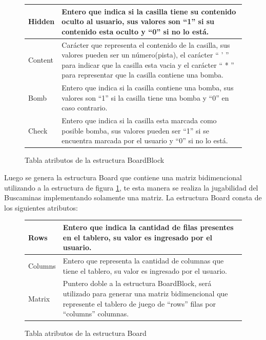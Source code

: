 \documentclass[letterpaper,12pt]{report}
\begin{document}
\begin{figure}[H]
    \centering
    \begin{tabular}{|l|p{10cm}|}
        \hline
        Hidden & Entero que indica si la casilla tiene su contenido oculto al usuario, sus valores son ``1'' si su contenido esta oculto y ``0'' si no lo está.\\
        \hline
        Content & Carácter que representa el contenido de la casilla, sus valores pueden ser un número(pista), el carácter `` ' '' para indicar que la casilla esta vacia y el carácter `` * '' para representar que la casilla contiene una bomba.\\
        \hline
        Bomb & Entero que indica si la casilla contiene una bomba, sus valores son ``1'' si la casilla tiene una bomba y ``0'' en caso contrario.\\
        \hline
        Check & Entero que indica si la casilla esta marcada como posible bomba, sus valores pueden ser ``1'' si se encuentra marcada por el usuario y ``0'' si no lo está.\\
        \hline
    \end{tabular}
    \caption{Tabla atributos de la estructura BoardBlock}
    \label{table:BoardBlock}
\end{figure}

Luego se genera la estructura Board que contiene una matriz bidimencional utilizando a la estructura de figura \ref{table:BoardBlock}, te esta manera se realiza la jugabilidad del Buscaminas implementando solamente una matriz. La estructura Board consta de los siguientes atributos:

\begin{figure}[H]
    \centering
    \begin{tabular}{|l|p{10cm}|}
        \hline
        Rows & Entero que indica la cantidad de filas presentes en el tablero, su valor es ingresado por el usuario.\\
        \hline
        Columns & Entero que representa la cantidad de columnas que tiene el tablero, su valor es ingresado por el usuario.\\
        \hline
        Matrix & Puntero doble a la estructura BoardBlock, será utilizado para generar una matriz bidimencional que represente el tablero de juego de ``rows'' filas por ``columns'' columnas.\\
        \hline
    \end{tabular}
    \caption{Tabla atributos de la estructura Board}
    \label{table:Board}
\end{figure}
\end{document}
